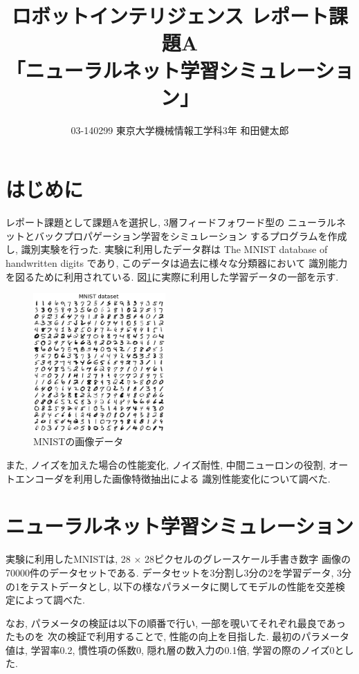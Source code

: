 \documentclass[10pt,a4paper,twocolumn]{jarticle}
\title{ロボットインテリジェンス レポート課題A \\
      「ニューラルネット学習シミュレーション」}
\author{03-140299 東京大学機械情報工学科3年 和田健太郎}
\begin{document}
\maketitle

\section{はじめに}
レポート課題として課題Aを選択し, 3層フィードフォワード型の
ニューラルネットとバックプロパゲーション学習をシミュレーション
するプログラムを作成し, 識別実験を行った. 
実験に利用したデータ群は
The MNIST database of handwritten digits
であり, このデータは過去に様々な分類器において
識別能力を図るために利用されている. \cite{mnist}
図\ref{fig:plot-mnist}に実際に利用した学習データの一部を示す. 

\begin{figure}[htbp]
  \centering
  \includegraphics[width=0.45\textwidth]{assets/img/tiled_mnist_nl0.0.eps}
  \caption{MNISTの画像データ}
  \label{fig:plot-mnist}
\end{figure}

また, ノイズを加えた場合の性能変化, ノイズ耐性, 
中間ニューロンの役割, オートエンコーダを利用した画像特徴抽出による
識別性能変化について調べた. 

\section{ニューラルネット学習シミュレーション}
実験に利用したMNISTは, 28 × 28ピクセルのグレースケール手書き数字
画像の70000件のデータセットである. 
データセットを3分割し3分の2を学習データ, 3分の1をテストデータとし, 
以下の様なパラメータに関してモデルの性能を交差検定によって調べた. 

なお, パラメータの検証は以下の順番で行い, 一部を覗いてそれぞれ最良であったものを
次の検証で利用することで, 性能の向上を目指した. 
最初のパラメータ値は, 学習率0.2, 慣性項の係数0, 
隠れ層の数入力の0.1倍, 学習の際のノイズ0とした. 
\end{document}
